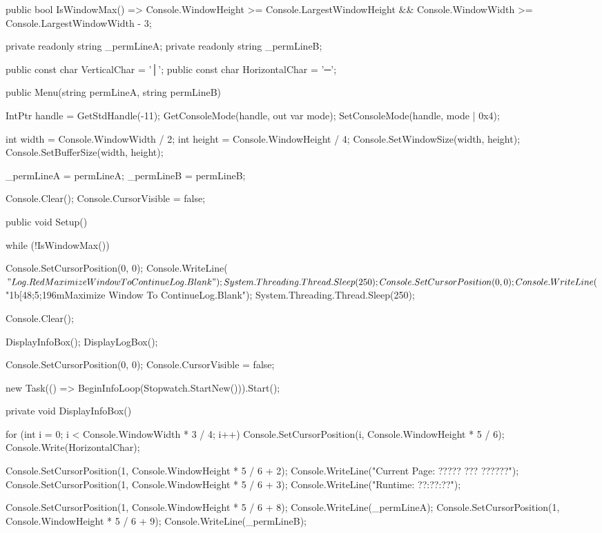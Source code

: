 \begin{flushleft}
\begin{cscode}
{    public bool IsWindowMax() => Console.WindowHeight >= Console.LargestWindowHeight && Console.WindowWidth >= Console.LargestWindowWidth - 3;

    private readonly string _permLineA;
    private readonly string _permLineB;

    public const char VerticalChar = '│';
    public const char HorizontalChar = '─';

    public Menu(string permLineA, string permLineB)
    {
        IntPtr handle = GetStdHandle(-11);
        GetConsoleMode(handle, out var mode);
        SetConsoleMode(handle, mode | 0x4);

        int width = Console.WindowWidth / 2;
        int height = Console.WindowHeight / 4;
        Console.SetWindowSize(width, height);
        Console.SetBufferSize(width, height);

        _permLineA = permLineA;
        _permLineB = permLineB;

        Console.Clear();
        Console.CursorVisible = false;
    }

    public void Setup()
    {
        while (!IsWindowMax())
        {
            Console.SetCursorPosition(0, 0);
            Console.WriteLine($"{Log.Red}Maximize Window To Continue{Log.Blank}");
            System.Threading.Thread.Sleep(250);
            Console.SetCursorPosition(0, 0);
            Console.WriteLine($"\x1b[48;5;196mMaximize Window To Continue{Log.Blank}");
            System.Threading.Thread.Sleep(250);

        }

        Console.Clear();

        DisplayInfoBox();
        DisplayLogBox();

        Console.SetCursorPosition(0, 0);
        Console.CursorVisible = false;

        new Task(() => BeginInfoLoop(Stopwatch.StartNew())).Start();
    }

    private void DisplayInfoBox()
    {
        for (int i = 0; i < Console.WindowWidth * 3 / 4; i++)
        {
            Console.SetCursorPosition(i, Console.WindowHeight * 5 / 6);
            Console.Write(HorizontalChar);
        }

        Console.SetCursorPosition(1, Console.WindowHeight * 5 / 6 + 2);
        Console.WriteLine("Current Page: ????? ??? ??????");
        Console.SetCursorPosition(1, Console.WindowHeight * 5 / 6 + 3);
        Console.WriteLine("Runtime:       ??:??:??");

        Console.SetCursorPosition(1, Console.WindowHeight * 5 / 6 + 8);
        Console.WriteLine(_permLineA);
        Console.SetCursorPosition(1, Console.WindowHeight * 5 / 6 + 9);
        Console.WriteLine(_permLineB);
    }

}
\end{cscode}
\end{flushleft}
